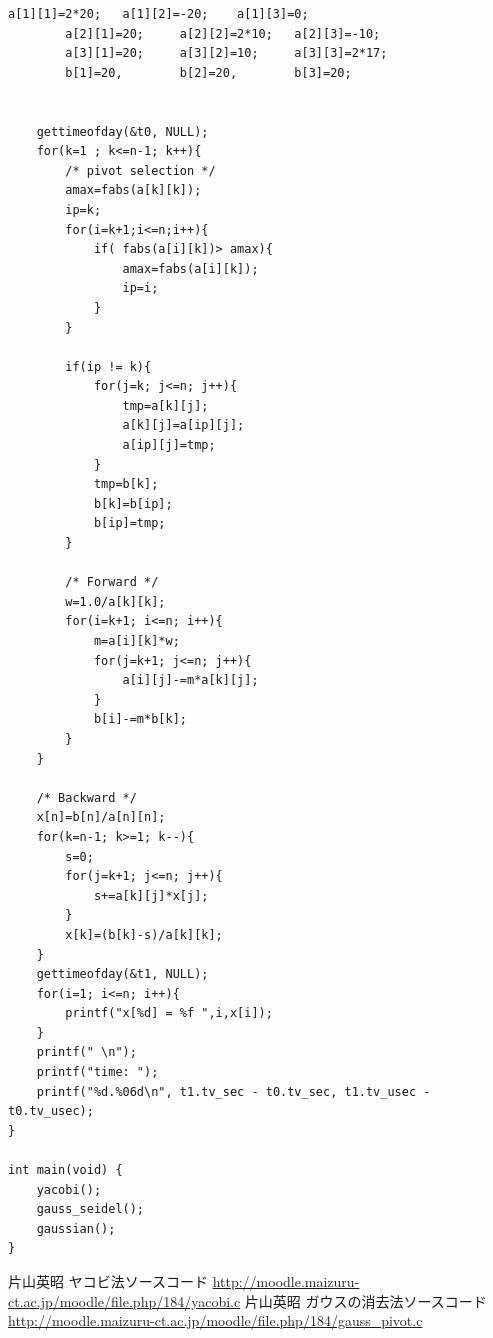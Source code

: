\documentclass[12pt]{jsarticle}
\begin{document}
\begin{lstlisting}[caption=answer.c,label={lst:answer}]
		a[1][1]=2*20;	a[1][2]=-20;	a[1][3]=0;
		a[2][1]=20;		a[2][2]=2*10;	a[2][3]=-10;
		a[3][1]=20;		a[3][2]=10;		a[3][3]=2*17;
		b[1]=20,		b[2]=20,		b[3]=20;

	
	gettimeofday(&t0, NULL);
	for(k=1 ; k<=n-1; k++){
		/* pivot selection */
		amax=fabs(a[k][k]);
		ip=k;
		for(i=k+1;i<=n;i++){
			if( fabs(a[i][k])> amax){
				amax=fabs(a[i][k]);
				ip=i;
			}
		}
	  
		if(ip != k){
			for(j=k; j<=n; j++){
				tmp=a[k][j];
				a[k][j]=a[ip][j];
				a[ip][j]=tmp;
			}
			tmp=b[k];
			b[k]=b[ip];
			b[ip]=tmp;
		}

		/* Forward */
		w=1.0/a[k][k];
		for(i=k+1; i<=n; i++){
			m=a[i][k]*w;
			for(j=k+1; j<=n; j++){
				a[i][j]-=m*a[k][j];
			}
			b[i]-=m*b[k];
		}
	}
	
	/* Backward */
	x[n]=b[n]/a[n][n];
	for(k=n-1; k>=1; k--){
		s=0;
		for(j=k+1; j<=n; j++){
			s+=a[k][j]*x[j];
		}
		x[k]=(b[k]-s)/a[k][k];
	}
	gettimeofday(&t1, NULL);
	for(i=1; i<=n; i++){
		printf("x[%d] = %f ",i,x[i]);
	}
	printf(" \n");
	printf("time: ");
	printf("%d.%06d\n", t1.tv_sec - t0.tv_sec, t1.tv_usec - t0.tv_usec);
}

int main(void) {
	yacobi();	
	gauss_seidel();
	gaussian();
}
\end{lstlisting}



\begin{thebibliography}{9}
	 片山英昭 ヤコビ法ソースコード \url{http://moodle.maizuru-ct.ac.jp/moodle/file.php/184/yacobi.c}
	 片山英昭 ガウスの消去法ソースコード \url{http://moodle.maizuru-ct.ac.jp/moodle/file.php/184/gauss_pivot.c}
\end{thebibliography}
\end{document}
